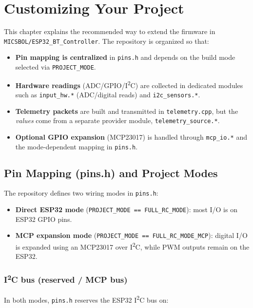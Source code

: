 \chapter{Customizing Your Project}

This chapter explains the recommended way to extend the firmware in
\texttt{MICSBOL/ESP32\_BT\_Controller}. The repository is organized so that:

\begin{itemize}
    \item \textbf{Pin mapping is centralized} in \texttt{pins.h} and depends on the build mode selected
    via \texttt{PROJECT\_MODE}.
    \item \textbf{Hardware readings} (ADC/GPIO/I\textsuperscript{2}C) are collected in dedicated modules such as
    \texttt{input\_hw.*} (ADC/digital reads) and \texttt{i2c\_sensors.*}.
    \item \textbf{Telemetry packets} are built and transmitted in \texttt{telemetry.cpp}, but the \emph{values}
    come from a separate provider module, \texttt{telemetry\_source.*}.
    \item \textbf{Optional GPIO expansion} (MCP23017) is handled through \texttt{mcp\_io.*} and the mode-dependent
    mapping in \texttt{pins.h}.
\end{itemize}

\section{Pin Mapping (pins.h) and Project Modes}

The repository defines two wiring modes in \texttt{pins.h}:

\begin{itemize}
    \item \textbf{Direct ESP32 mode} (\texttt{PROJECT\_MODE == FULL\_RC\_MODE}): most I/O is on ESP32 GPIO pins.
    \item \textbf{MCP expansion mode} (\texttt{PROJECT\_MODE == FULL\_RC\_MODE\_MCP}): digital I/O is expanded using an
    MCP23017 over I\textsuperscript{2}C, while PWM outputs remain on the ESP32.
\end{itemize}

\subsection{I\textsuperscript{2}C bus (reserved / MCP bus)}
In both modes, \texttt{pins.h} reserves the ESP32 I\textsuperscript{2}C bus on:


